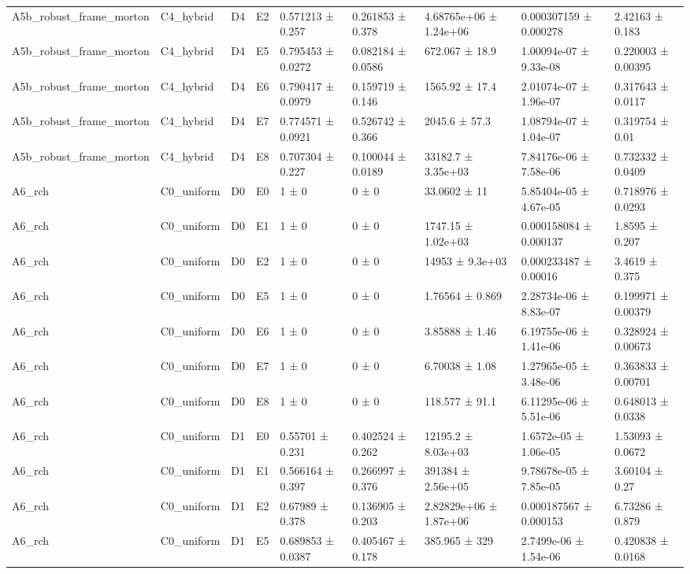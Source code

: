 \begin{table}
\begin{tabular}{lllllllll}
A5b\_robust\_frame\_morton & C4\_hybrid & D4 & E2 & 0.571213 ± 0.257 & 0.261853 ± 0.378 & 4.68765e+06 ± 1.24e+06 & 0.000307159 ± 0.000278 & 2.42163 ± 0.183 \\
A5b\_robust\_frame\_morton & C4\_hybrid & D4 & E5 & 0.795453 ± 0.0272 & 0.082184 ± 0.0586 & 672.067 ± 18.9 & 1.00094e-07 ± 9.33e-08 & 0.220003 ± 0.00395 \\
A5b\_robust\_frame\_morton & C4\_hybrid & D4 & E6 & 0.790417 ± 0.0979 & 0.159719 ± 0.146 & 1565.92 ± 17.4 & 2.01074e-07 ± 1.96e-07 & 0.317643 ± 0.0117 \\
A5b\_robust\_frame\_morton & C4\_hybrid & D4 & E7 & 0.774571 ± 0.0921 & 0.526742 ± 0.366 & 2045.6 ± 57.3 & 1.08794e-07 ± 1.04e-07 & 0.319754 ± 0.01 \\
A5b\_robust\_frame\_morton & C4\_hybrid & D4 & E8 & 0.707304 ± 0.227 & 0.100044 ± 0.0189 & 33182.7 ± 3.35e+03 & 7.84176e-06 ± 7.58e-06 & 0.732332 ± 0.0409 \\
A6\_rch & C0\_uniform & D0 & E0 & 1 ± 0 & 0 ± 0 & 33.0602 ± 11 & 5.85404e-05 ± 4.67e-05 & 0.718976 ± 0.0293 \\
A6\_rch & C0\_uniform & D0 & E1 & 1 ± 0 & 0 ± 0 & 1747.15 ± 1.02e+03 & 0.000158084 ± 0.000137 & 1.8595 ± 0.207 \\
A6\_rch & C0\_uniform & D0 & E2 & 1 ± 0 & 0 ± 0 & 14953 ± 9.3e+03 & 0.000233487 ± 0.00016 & 3.4619 ± 0.375 \\
A6\_rch & C0\_uniform & D0 & E5 & 1 ± 0 & 0 ± 0 & 1.76564 ± 0.869 & 2.28734e-06 ± 8.83e-07 & 0.199971 ± 0.00379 \\
A6\_rch & C0\_uniform & D0 & E6 & 1 ± 0 & 0 ± 0 & 3.85888 ± 1.46 & 6.19755e-06 ± 1.41e-06 & 0.328924 ± 0.00673 \\
A6\_rch & C0\_uniform & D0 & E7 & 1 ± 0 & 0 ± 0 & 6.70038 ± 1.08 & 1.27965e-05 ± 3.48e-06 & 0.363833 ± 0.00701 \\
A6\_rch & C0\_uniform & D0 & E8 & 1 ± 0 & 0 ± 0 & 118.577 ± 91.1 & 6.11295e-06 ± 5.51e-06 & 0.648013 ± 0.0338 \\
A6\_rch & C0\_uniform & D1 & E0 & 0.55701 ± 0.231 & 0.402524 ± 0.262 & 12195.2 ± 8.03e+03 & 1.6572e-05 ± 1.06e-05 & 1.53093 ± 0.0672 \\
A6\_rch & C0\_uniform & D1 & E1 & 0.566164 ± 0.397 & 0.266997 ± 0.376 & 391384 ± 2.56e+05 & 9.78678e-05 ± 7.85e-05 & 3.60104 ± 0.27 \\
A6\_rch & C0\_uniform & D1 & E2 & 0.67989 ± 0.378 & 0.136905 ± 0.203 & 2.82829e+06 ± 1.87e+06 & 0.000187567 ± 0.000153 & 6.73286 ± 0.879 \\
A6\_rch & C0\_uniform & D1 & E5 & 0.689853 ± 0.0387 & 0.405467 ± 0.178 & 385.965 ± 329 & 2.7499e-06 ± 1.54e-06 & 0.420838 ± 0.0168 \\

\end{tabular}
\end{table}
